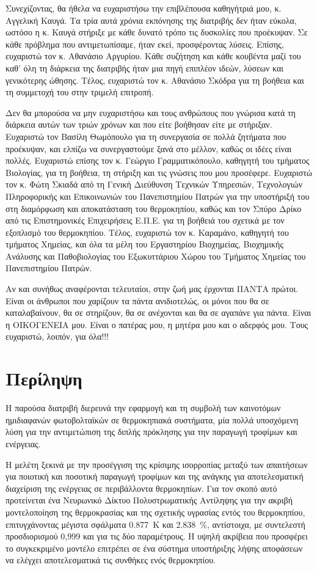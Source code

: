 \documentclass[12pt, a4paper]{report} %
\newcommand{\perilipsi}{%
  \chapter*{Περίληψη}%
  \addcontentsline{toc}{chapter}{Περίληψη}%
}
\begin{document}
    Συνεχίζοντας, θα ήθελα να ευχαριστήσω την επιβλέπουσα καθηγήτριά μου, κ. Αγγελική Καυγά. Τα τρία αυτά χρόνια 
    εκπόνησης της διατριβής δεν ήταν εύκολα, ωστόσο η κ. Καυγά στήριξε με κάθε δυνατό τρόπο τις δυσκολίες που προέκυψαν. 
    Σε κάθε πρόβλημα που αντιμετωπίσαμε, ήταν εκεί, προσφέροντας λύσεις. Επίσης, ευχαριστώ τον κ. Αθανάσιο Αργυρίου. 
    Κάθε συζήτηση και κάθε κουβέντα μαζί του καθ' όλη τη διάρκεια της διατριβής ήταν μια πηγή επιπλέον ιδεών, λύσεων 
    και γενικότερης ώθησης. Τέλος, ευχαριστώ τον κ. Αθανάσιο Σκόδρα για τη βοήθεια και τη συμμετοχή του στην τριμελή 
    επιτροπή.

    Δεν θα μπορούσα να μην ευχαριστήσω και τους ανθρώπους που γνώρισα κατά τη διάρκεια αυτών των τριών χρόνων και που 
    είτε βοήθησαν είτε με στήριξαν. Ευχαριστώ τον Βασίλη Θωμόπουλο για τη συνεργασία σε πολλά ζητήματα που προέκυψαν, 
    και ελπίζω να συνεργαστούμε ξανά στο μέλλον, καθώς οι ιδέες είναι πολλές. Ευχαριστώ επίσης τον κ. Γεώργιο 
    Γραμματικόπουλο, καθηγητή του τμήματος Βιολογίας, για τη βοήθεια, τη στήριξη και τις γνώσεις που μου προσέφερε. 
    Ευχαριστώ τον κ. Φώτη Σκιαδά από τη Γενική Διεύθυνση Τεχνικών Υπηρεσιών, Τεχνολογιών Πληροφορικής και Επικοινωνιών 
    του Πανεπιστημίου Πατρών για την υποστήριξή του στη διαμόρφωση και αποκατάσταση του θερμοκηπίου, καθώς και τον Σπύρο 
    Δρίκο από τις Επιστημονικές Επιχειρήσεις Ε.Π.Ε. για τη βοήθειά του σχετικά με τον εξοπλισμό του θερμοκηπίου. Τέλος, 
    ευχαριστώ τον κ. Καραμάνο, καθηγητή του τμήματος Χημείας, και όλα τα μέλη του Εργαστηρίου Βιοχημείας, Βιοχημικής 
    Ανάλυσης και Παθοβιολογίας του Εξωκυττάριου Χώρου του Τμήματος Χημείας του Πανεπιστημίου Πατρών.

    Αν και συνήθως αναφέρονται τελευταίοι, στην ζωή μας έρχονται ΠΑΝΤΑ πρώτοι. Είναι οι άνθρωποι που χαρίζουν τα πάντα 
    ανιδιοτελώς, οι μόνοι που θα σε καταλαβαίνουν, θα σε στηρίζουν, θα σε ανέχονται και θα σε αγαπάνε για πάντα. Είναι 
    η ΟΙΚΟΓΕΝΕΙΑ μου. Είναι ο πατέρας μου, η μητέρα μου και ο αδερφός μου. Τους ευχαριστώ, λοιπόν, για όλα!!!


\newpage
\perilipsi
    Η παρούσα διατριβή διερευνά την εφαρμογή και τη συμβολή των καινοτόμων ημιδιαφανών φωτοβολταϊκών σε 
    θερμοκηπιακά συστήματα, μία πολλά υποσχόμενη λύση για την αντιμετώπιση της διπλής πρόκλησης για την 
    παραγωγή τροφίμων και ενέργειας.

    Η μελέτη ξεκινά με την προσέγγιση της κρίσιμης ισορροπίας μεταξύ των απαιτήσεων για ποιοτική και 
    ποσοτική παραγωγή τροφίμων και της ανάγκης για αποτελεσματική διαχείριση της ενέργειας σε περιβάλλοντα 
    θερμοκηπίων. Για τον σκοπό αυτό προτείνεται ένα Νευρωνικό Δίκτυο Πολυστρωματικής Αντίληψης για την 
    ακριβή μοντελοποίηση της θερμοκρασίας και της σχετικής υγρασίας εντός του θερμοκηπίου, επιτυγχάνοντας 
    μέγιστα σφάλματα \SI{0,877}{\kelvin} και \SI{2,838}{\percent}, αντίστοιχα, με συντελεστή προσδιορισμού 
    0,999 και για τις δύο παραμέτρους. Η υψηλή ακρίβεια που προσφέρει το συγκεκριμένο μοντέλο επιτρέπει σε 
    ένα σύστημα υποστήριξης λήψης αποφάσεων να ελέγχει αποτελεσματικά τις συνθήκες ενός θερμοκηπίου.
\end{document}
